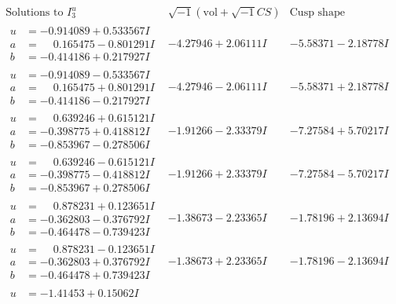\documentclass[1p]{elsarticle_modified}
\theoremstyle{definition}
\newcommand{\I}{\sqrt{-1}}
\begin{document}
$$\begin{array}{c|c|c}  
\text{Solutions to }I^u_{3}& \I (\text{vol} + \sqrt{-1}CS) & \text{Cusp shape}\\
 \hline 
\begin{aligned}
u &= -0.914089 + 0.533567 I \\
a &= \phantom{-}0.165475 - 0.801291 I \\
b &= -0.414186 + 0.217927 I\end{aligned}
 & -4.27946 + 2.06111 I & -5.58371 - 2.18778 I \\ \hline\begin{aligned}
u &= -0.914089 - 0.533567 I \\
a &= \phantom{-}0.165475 + 0.801291 I \\
b &= -0.414186 - 0.217927 I\end{aligned}
 & -4.27946 - 2.06111 I & -5.58371 + 2.18778 I \\ \hline\begin{aligned}
u &= \phantom{-}0.639246 + 0.615121 I \\
a &= -0.398775 + 0.418812 I \\
b &= -0.853967 - 0.278506 I\end{aligned}
 & -1.91266 - 2.33379 I & -7.27584 + 5.70217 I \\ \hline\begin{aligned}
u &= \phantom{-}0.639246 - 0.615121 I \\
a &= -0.398775 - 0.418812 I \\
b &= -0.853967 + 0.278506 I\end{aligned}
 & -1.91266 + 2.33379 I & -7.27584 - 5.70217 I \\ \hline\begin{aligned}
u &= \phantom{-}0.878231 + 0.123651 I \\
a &= -0.362803 - 0.376792 I \\
b &= -0.464478 - 0.739423 I\end{aligned}
 & -1.38673 - 2.23365 I & -1.78196 + 2.13694 I \\ \hline\begin{aligned}
u &= \phantom{-}0.878231 - 0.123651 I \\
a &= -0.362803 + 0.376792 I \\
b &= -0.464478 + 0.739423 I\end{aligned}
 & -1.38673 + 2.23365 I & -1.78196 - 2.13694 I \\ \hline\begin{aligned}
u &= -1.41453 + 0.15062 I \\

\end{aligned}
\end{array}$$
\end{document}
